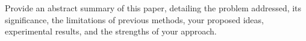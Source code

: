 Provide an abstract summary of this paper, detailing the problem addressed, its significance, the limitations of previous methods, your proposed ideas, experimental results, and the strengths of your approach.